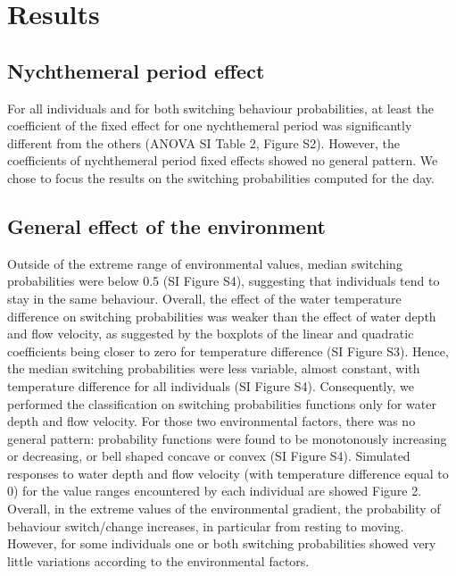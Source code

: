 \documentclass[
  letterpaper,
  DIV=11,
  numbers=noendperiod]{scrartcl}
\begin{document}
\hypertarget{results}{%
\section{Results}\label{results}}

\hypertarget{nychthemeral-period-effect}{%
\subsection{Nychthemeral period
effect}\label{nychthemeral-period-effect}}

For all individuals and for both switching behaviour probabilities, at
least the coefficient of the fixed effect for one nychthemeral period
was significantly different from the others (ANOVA SI Table 2, Figure
S2). However, the coefficients of nychthemeral period fixed effects
showed no general pattern. We chose to focus the results on the
switching probabilities computed for the day.

\hypertarget{general-effect-of-the-environment}{%
\subsection{General effect of the
environment}\label{general-effect-of-the-environment}}

Outside of the extreme range of environmental values, median switching
probabilities were below 0.5 (SI Figure S4), suggesting that individuals
tend to stay in the same behaviour. Overall, the effect of the water
temperature difference on switching probabilities was weaker than the
effect of water depth and flow velocity, as suggested by the boxplots of
the linear and quadratic coefficients being closer to zero for
temperature difference (SI Figure S3). Hence, the median switching
probabilities were less variable, almost constant, with temperature
difference for all individuals (SI Figure S4). Consequently, we
performed the classification on switching probabilities functions only
for water depth and flow velocity. For those two environmental factors,
there was no general pattern: probability functions were found to be
monotonously increasing or decreasing, or bell shaped concave or convex
(SI Figure S4). Simulated responses to water depth and flow velocity
(with temperature difference equal to 0) for the value ranges
encountered by each individual are showed Figure 2. Overall, in the
extreme values of the environmental gradient, the probability of
behaviour switch/change increases, in particular from resting to moving.
However, for some individuals one or both switching probabilities showed
very little variations according to the environmental factors.
\end{document}
